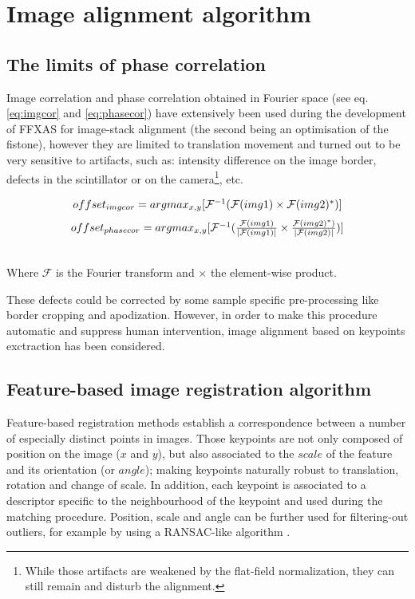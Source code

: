 \documentclass[preprint]{iucr}
\begin{document}
\section{Image alignment algorithm}

\subsection{The limits of phase correlation}

Image correlation and phase correlation obtained in Fourier space (see eq.
\ref{eq:imgcor} and \ref{eq:phasecor}) have
extensively been used during the development of FFXAS for image-stack alignment
(the second being an optimisation of the fistone), however they are
limited to translation movement and turned out to be very sensitive to artifacts, such as:
intensity difference on the image border, defects in the
scintillator or on the camera\footnote{While those artifacts are weakened by
the flat-field normalization, they can still remain and disturb the alignment.},
etc.

\begin{center}
\begin{equation}
\label{eq:imgcor}
$$offset_{img cor} =
argmax_{x,y}[\mathcal{F}^{-1}(\mathcal{F}(img1)\times\mathcal{F}(img2)^*)]$$
\end{equation}
\begin{equation}
\label{eq:phasecor}
$$offset_{phase cor} =
argmax_{x,y}[\mathcal{F}^{-1}(\frac{\mathcal{F}(img1)}{|\mathcal{F}(img1)|}
\times\frac{\mathcal{F}(img2)^*)}{|\mathcal{F}(img2)|})]$$
\end{equation}

\\Where $\mathcal{F}$ is the Fourier transform and $\times$ the element-wise
product.
\end{center}

These defects could be corrected by some sample
specific pre-processing like border cropping and apodization.
However, in order to make this procedure automatic and suppress human
intervention, image alignment based on keypoints exctraction has been
considered.

\subsection{Feature-based image registration algorithm}

Feature-based registration methods establish a correspondence between a
number of especially distinct points in images.
Those keypoints are not only composed of position on the image ($x$ and $y$),
but also associated to the $scale$ of the feature and its
orientation (or $angle$);
making keypoints naturally robust to
translation, rotation and change of scale.
In addition, each keypoint is associated to a descriptor specific to the
neighbourhood of the keypoint and used during the matching procedure. Position,
scale and angle can be further used for filtering-out outliers, for example by
using a RANSAC-like algorithm \cite{orsa}.
\end{document}
